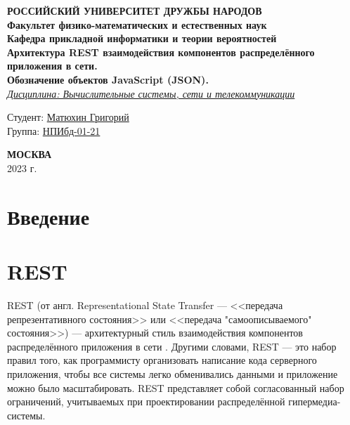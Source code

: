 \documentclass[a4page]{article}
\begin{document}
\begin{titlepage}
	\begin{center}
		\hfill \break
		\textbf{
			\large{РОССИЙСКИЙ УНИВЕРСИТЕТ ДРУЖБЫ НАРОДОВ}\\
			\normalsize{Факультет физико-математических и естественных наук}\\
			\normalsize{Кафедра прикладной информатики и теории вероятностей}\\
		}
		\vspace*{\fill}
		\Large{\textbf{Архитектура REST взаимодействия компонентов распределённого приложения в сети.\\Обозначение объектов JavaScript (JSON).}}
		\\
		\underline{\textit{\normalsize{Дисциплина: Вычислительные системы, сети и телекоммуникации}}}
		\vspace*{\fill}

	\end{center}

	\begin{flushright}
		Студент: \underline{Матюхин Григорий}\\ \vspace{0.5cm}
		Группа: \underline{НПИбд-01-21}
	\end{flushright}

	\begin{center} \textbf{МОСКВА} \\ 2023 г. \end{center}
	\thispagestyle{empty}

\end{titlepage}

\newpage

\tableofcontents

\newpage
\section{Введение}

\newpage
\section{REST}
REST (от англ. Representational State Transfer ---
<<передача репрезентативного состояния>> или <<передача "самоописываемого" состояния>>) ---
архитектурный стиль взаимодействия компонентов распределённого приложения в сети \cite{REST}.
Другими словами, REST --- это набор правил того,
как программисту организовать написание кода серверного приложения,
чтобы все системы легко обменивались данными и приложение можно было масштабировать.
REST представляет собой согласованный набор ограничений,
учитываемых при проектировании распределённой гипермедиа-системы.
\end{document}
